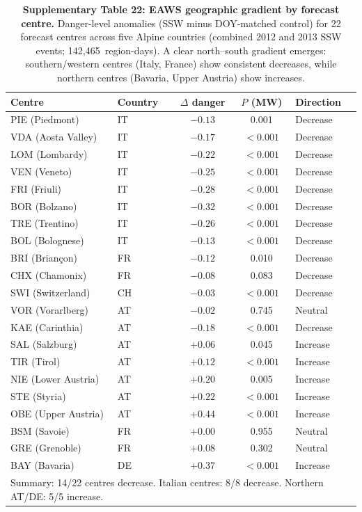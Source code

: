 \begin{table}[!ht]
\centering
\caption{\textbf{Supplementary Table 22: EAWS geographic gradient by forecast centre.}
Danger-level anomalies (SSW minus DOY-matched control) for 22 forecast centres across five Alpine countries (combined 2012 and 2013 SSW events; 142,465~region-days). A clear north--south gradient emerges: southern/western centres (Italy, France) show consistent decreases, while northern centres (Bavaria, Upper Austria) show increases.}
\label{tab:eaws_gradient}
\small
\begin{tabular}{llccl}
\toprule
Centre & Country & $\Delta$ danger & $P$ (MW) & Direction \\
\midrule
PIE (Piedmont) & IT & $-0.13$ & 0.001 & Decrease \\
VDA (Aosta Valley) & IT & $-0.17$ & $< 0.001$ & Decrease \\
LOM (Lombardy) & IT & $-0.22$ & $< 0.001$ & Decrease \\
VEN (Veneto) & IT & $-0.25$ & $< 0.001$ & Decrease \\
FRI (Friuli) & IT & $-0.28$ & $< 0.001$ & Decrease \\
BOR (Bolzano) & IT & $-0.32$ & $< 0.001$ & Decrease \\
TRE (Trentino) & IT & $-0.26$ & $< 0.001$ & Decrease \\
BOL (Bolognese) & IT & $-0.13$ & $< 0.001$ & Decrease \\
BRI (Briançon) & FR & $-0.12$ & 0.010 & Decrease \\
CHX (Chamonix) & FR & $-0.08$ & 0.083 & Decrease \\
SWI (Switzerland) & CH & $-0.03$ & $< 0.001$ & Decrease \\
VOR (Vorarlberg) & AT & $-0.02$ & 0.745 & Neutral \\
KAE (Carinthia) & AT & $-0.18$ & $< 0.001$ & Decrease \\
SAL (Salzburg) & AT & $+0.06$ & 0.045 & Increase \\
TIR (Tirol) & AT & $+0.12$ & $< 0.001$ & Increase \\
NIE (Lower Austria) & AT & $+0.20$ & 0.005 & Increase \\
STE (Styria) & AT & $+0.22$ & $< 0.001$ & Increase \\
OBE (Upper Austria) & AT & $+0.44$ & $< 0.001$ & Increase \\
BSM (Savoie) & FR & $+0.00$ & 0.955 & Neutral \\
GRE (Grenoble) & FR & $+0.08$ & 0.302 & Neutral \\
BAY (Bavaria) & DE & $+0.37$ & $< 0.001$ & Increase \\
\bottomrule
\multicolumn{5}{l}{\footnotesize Summary: 14/22 centres decrease. Italian centres: 8/8 decrease. Northern AT/DE: 5/5 increase.}
\end{tabular}
\end{table}

